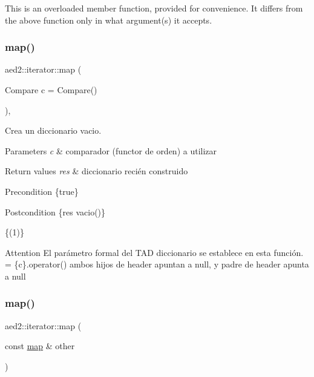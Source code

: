 This is an overloaded member function, provided for convenience. It differs from the above function only in what argument(s) it accepts. \mbox{\label{classaed2_1_1iterator_ab55f7bc4639e905d66935b56995a5b1f}} 
\subsubsection{\texorpdfstring{map()}{map()}\hspace{0.1cm}{\footnotesize\ttfamily [1/3]}}
{\footnotesize\ttfamily aed2\+::iterator\+::map (\begin{DoxyParamCaption}\item[{Compare}]{c = {\ttfamily Compare()} }\end{DoxyParamCaption})\hspace{0.3cm}{\ttfamily [inline]}, {\ttfamily [explicit]}}



Crea un diccionario vacio. 


\begin{DoxyParams}{Parameters}
{\em c} & comparador (functor de orden) a utilizar \\
\hline
\end{DoxyParams}

\begin{DoxyRetVals}{Return values}
{\em res} & diccionario recién construido\\
\hline
\end{DoxyRetVals}
\begin{DoxyPrecond}{Precondition}
\{true\} 
\end{DoxyPrecond}
\begin{DoxyPostcond}{Postcondition}
\{res  vacio()\}
\end{DoxyPostcond}
\{(1)\}

\begin{DoxyAttention}{Attention}
El parámetro formal  del T\+AD diccionario se establece en esta función.  = \{c\}.operator() ambos hijos de header apuntan a null, y padre de header apunta a null 
\end{DoxyAttention}
\mbox{\label{classaed2_1_1iterator_aee42bcaf809b71168f4266e1d05971e2}} 
\subsubsection{\texorpdfstring{map()}{map()}\hspace{0.1cm}{\footnotesize\ttfamily [2/3]}}
{\footnotesize\ttfamily aed2\+::iterator\+::map (\begin{DoxyParamCaption}\item[{const \hyperlink{classaed2_1_1map}{map} \&}]{other }\end{DoxyParamCaption})\hspace{0.3cm}{\ttfamily [inline]}}



